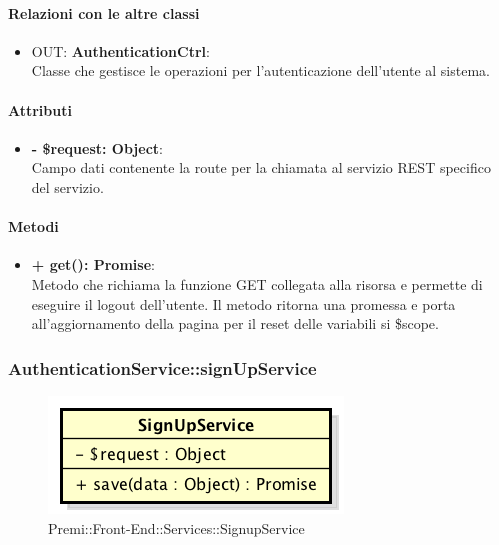 		\paragraph{Relazioni con le altre classi}
		\begin{itemize}
			\item OUT: \textbf{AuthenticationCtrl}:\\
			Classe che gestisce le operazioni per l'autenticazione dell'utente al sistema.
		\end{itemize}
		
		\paragraph{Attributi}
		\begin{itemize}
			\item \textbf{- \$request: Object}:\\
			Campo dati contenente la route per la chiamata al servizio \gls{REST} specifico del servizio.
		\end{itemize}	
		
		\paragraph{Metodi}
		\begin{itemize}
			\item \textbf{+ get(): Promise}:\\
			Metodo che richiama la funzione GET collegata alla risorsa e permette di eseguire il logout dell'utente. Il metodo ritorna una promessa e porta all'aggiornamento della pagina per il reset delle variabili si \$scope.
		\end{itemize}
\newpage
		
		
		\subsubsection{AuthenticationService::signUpService}
		\begin{figure}[h]
			\centering
				\includegraphics[width=0.4\linewidth]{img/premi_front_end_services_signupservice}
			\caption[Premi::Front-End::Services::SignupService]{Premi::Front-End::Services::SignupService}
		\end{figure}
		
